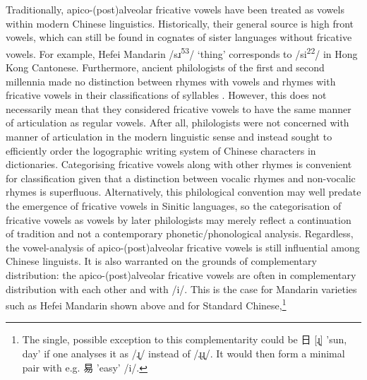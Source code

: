 \documentclass[output=paper,colorlinks,citecolor=brown,chinesefont]{langscibook}
\begin{document}
Traditionally, apico-(post)alveolar fricative vowels have been treated as vowels within modern Chinese linguistics. Historically, their general source is high front vowels, which can still be found in cognates of sister languages without fricative vowels. For example, Hefei Mandarin /sɹ\textsuperscript{53}/ `thing' corresponds to /si\textsuperscript{22}/ in Hong Kong Cantonese. Furthermore, ancient philologists of the first and second millennia made no distinction between rhymes with vowels and rhymes with fricative vowels in their classifications of syllables \citep{shen_phonological_2020}. However, this does not necessarily mean that they considered fricative vowels to have the same manner of articulation as regular vowels. After all, philologists were not concerned with manner of articulation in the modern linguistic sense and instead sought to efficiently order the logographic writing system of Chinese characters in dictionaries. Categorising fricative vowels along with other rhymes is convenient for classification given that a distinction between vocalic rhymes and non-vocalic rhymes is superfluous. Alternatively, this philological convention may well predate the emergence of fricative vowels in Sinitic languages, so the categorisation of fricative vowels as vowels by later philologists may merely reflect a continuation of tradition and not a contemporary phonetic/phonological analysis. Regardless, the vowel-analysis of apico-(post)alveolar fricative vowels is still influential among Chinese linguists. It is also warranted on the grounds of complementary distribution: the apico-(post)alveolar fricative vowels are often in complementary distribution with each other and with /i/. This is the case for Mandarin varieties such as Hefei Mandarin \citep{Kong_et_al_2022} shown above and for Standard Chinese,\footnote{The
    single, possible exception to this complementarity could be {\cn 日} [ɻ̩] 'sun, day' if one analyses it as /ɻ̩/ instead of /ɻɻ̩/. It would then form a minimal pair with e.g. {\cn 易} 'easy' /i/.
}
\end{document}
